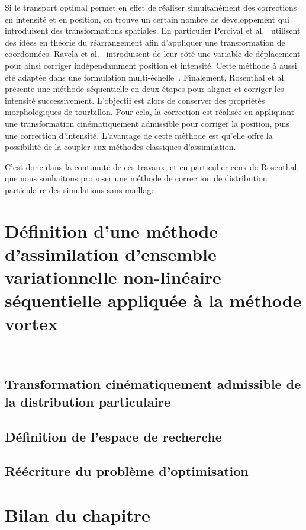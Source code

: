 Si le transport optimal permet en effet de réaliser simultanément des corrections en intensité et en position, on trouve un certain nombre de développement qui introduisent des transformations spatiales. En particulier Percival et al.~\cite{percival_department_2008} utilisent des idées en théorie du réarrangement afin d'appliquer une transformation de coordonnées. Ravela et al.~\cite{ravela_data_2007} introduisent de leur côté une variable de déplacement pour ainsi corriger indépendamment position et intensité. Cette méthode à aussi été adaptée dans une formulation multi-échelle~\cite{ying_multiscale_2019,ying_improving_2023}. Finalement, Rosenthal et al.~\cite{rosenthal_displacement_2017} présente une méthode séquentielle en deux étapes pour aligner et corriger les intensité successivement. L'objectif est alors de conserver des propriétés morphologiques de tourbillon. Pour cela, la correction est réalisée en appliquant une transformation cinématiquement admissible pour corriger la position, puis une correction d'intensité. L'avantage de cette méthode est qu'elle offre la possibilité de la coupler aux méthodes classiques d'assimilation.

C'est donc dans la continuité de ces travaux, et en particulier ceux de Rosenthal, que nous souhaitons proposer une méthode de correction de distribution particulaire des simulations sans maillage.

\section{Définition d'une méthode d'assimilation d'ensemble variationnelle non-linéaire séquentielle appliquée à la méthode vortex}~\label{sec:align_vortex}

\subsection{Transformation cinématiquement admissible de la distribution particulaire}

\subsection{Définition de l'espace de recherche}

\subsection{Réécriture du problème d'optimisation}

\section{Bilan du chapitre}

